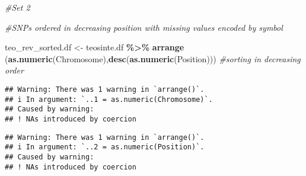 \documentclass[
]{article}
\newenvironment{Shaded}{\begin{snugshade}}{\end{snugshade}}
\newcommand{\CommentTok}[1]{\textcolor[rgb]{0.56,0.35,0.01}{\textit{#1}}}
\newcommand{\FunctionTok}[1]{\textcolor[rgb]{0.13,0.29,0.53}{\textbf{#1}}}
\newcommand{\NormalTok}[1]{#1}
\newcommand{\OtherTok}[1]{\textcolor[rgb]{0.56,0.35,0.01}{#1}}
\newcommand{\SpecialCharTok}[1]{\textcolor[rgb]{0.81,0.36,0.00}{\textbf{#1}}}
\begin{document}
\begin{Shaded}
\begin{Highlighting}[]
\CommentTok{\#Set 2}

\CommentTok{\#SNPs ordered in decreasing position with missing values encoded by \textquotesingle{}{-}\textquotesingle{} symbol}

\NormalTok{teo\_rev\_sorted.df }\OtherTok{\textless{}{-}}\NormalTok{ teosinte.df }\SpecialCharTok{\%\textgreater{}\%}
  \FunctionTok{arrange}\NormalTok{ (}\FunctionTok{as.numeric}\NormalTok{(Chromosome),}\FunctionTok{desc}\NormalTok{(}\FunctionTok{as.numeric}\NormalTok{(Position)))   }\CommentTok{\#sorting in decreasing order}
\end{Highlighting}
\end{Shaded}

\begin{verbatim}
## Warning: There was 1 warning in `arrange()`.
## i In argument: `..1 = as.numeric(Chromosome)`.
## Caused by warning:
## ! NAs introduced by coercion
\end{verbatim}

\begin{verbatim}
## Warning: There was 1 warning in `arrange()`.
## i In argument: `..2 = as.numeric(Position)`.
## Caused by warning:
## ! NAs introduced by coercion
\end{verbatim}
\end{document}
